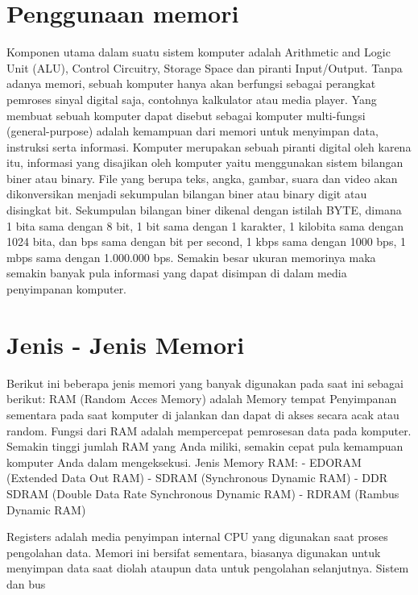 \section{Penggunaan memori}
Komponen utama dalam suatu sistem komputer adalah Arithmetic and Logic Unit (ALU), Control Circuitry, Storage Space dan piranti Input/Output. Tanpa adanya memori, sebuah komputer hanya akan berfungsi sebagai perangkat pemroses sinyal digital saja, contohnya kalkulator atau media player. Yang membuat sebuah komputer dapat disebut sebagai komputer multi-fungsi (general-purpose)  adalah kemampuan  dari memori untuk menyimpan data, instruksi serta informasi. Komputer merupakan sebuah piranti digital oleh karena itu, informasi yang disajikan oleh komputer yaitu menggunakan sistem bilangan biner atau binary. File yang berupa teks, angka, gambar, suara dan video akan dikonversikan menjadi sekumpulan bilangan biner atau binary digit atau disingkat bit. Sekumpulan bilangan biner dikenal dengan istilah BYTE, dimana  1 bita sama dengan 8 bit, 1 bit sama dengan 1 karakter, 1 kilobita sama dengan 1024 bita, dan bps sama dengan bit per second, 1 kbps sama dengan 1000 bps, 1 mbps sama dengan 1.000.000 bps. Semakin besar ukuran memorinya maka semakin banyak pula informasi yang dapat disimpan di dalam media penyimpanan komputer.

\section{Jenis - Jenis Memori}
Berikut ini beberapa jenis memori yang banyak digunakan pada saat ini sebagai berikut:
RAM (Random Acces Memory) adalah Memory tempat Penyimpanan sementara pada saat komputer di jalankan dan dapat di akses secara acak atau random. Fungsi dari RAM adalah mempercepat pemrosesan data pada komputer. Semakin tinggi jumlah RAM yang Anda miliki, semakin cepat pula kemampuan komputer Anda dalam mengeksekusi.
Jenis Memory RAM:  
- EDORAM (Extended Data Out RAM)  
- SDRAM (Synchronous Dynamic RAM)  
- DDR SDRAM (Double Data Rate Synchronous Dynamic RAM) 
- RDRAM (Rambus Dynamic RAM)

Registers adalah media penyimpan internal CPU yang digunakan saat proses pengolahan data. Memori ini bersifat sementara, biasanya digunakan untuk menyimpan data saat diolah ataupun data untuk pengolahan selanjutnya. Sistem dan bus




